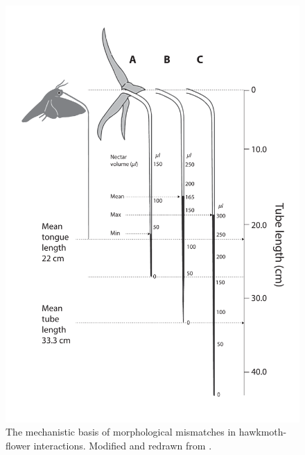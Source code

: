\documentclass[a4paper,12pt]{article}
\begin{document}
\begin{figure}[h!]
  \caption{The mechanistic basis of morphological mismatches in hawkmoth-flower interactions. Modified and redrawn from \citep{Arditti:2012}.}
  \label{Fig2}
  \begin{center}
    \includegraphics[width=14cm]{Fig2}
  \end{center}
\end{figure}
\end{document}
